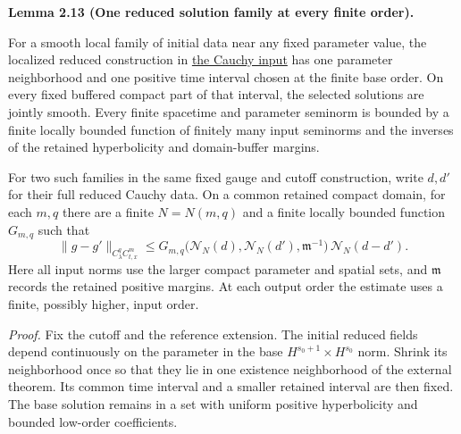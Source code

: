 \documentclass[
  english,
  11pt,
  reqno]{amsart}
\makeatletter
\newcommand{\pandocstatementheading}[1]{%
  \par\if@nobreak\else
    \addpenalty{\@beginparpenalty}%
    \addvspace{.5\baselineskip plus .2\baselineskip minus .2\baselineskip}%
  \fi
  {\normalfont\bfseries #1\par}%
  \nobreak\@afterindenttrue\@afterheading
}
\makeatother
\begin{document}
\pandocstatementheading{\leavevmode{}\label{lem:online-reduced-cauchy-finite-family-estimates}Lemma 2.13 (One reduced solution family at every finite order).}

For a smooth local family of initial data near any fixed parameter
value, the localized reduced construction in
\hyperref[thm:online-smooth-local-cauchy-input]{the Cauchy input} has
one parameter neighborhood and one positive time interval chosen at the
finite base order. On every fixed buffered compact part of that
interval, the selected solutions are jointly smooth. Every finite
spacetime and parameter seminorm is bounded by a finite locally bounded
function of finitely many input seminorms and the inverses of the
retained hyperbolicity and domain-buffer margins.

For two such families in the same fixed gauge and cutoff construction,
write \(d,d'\) for their full reduced Cauchy data. On a common retained
compact domain, for each \(m,q\) there are a finite \(N=N(m,q)\) and a
finite locally bounded function \(G_{m,q}\) such that%
 \[
\|g-g'\|_{C^q_\lambda C^m_{t,x}}
\le
G_{m,q}\bigl(\mathcal N_N(d),\mathcal N_N(d'),
\mathfrak m^{-1}\bigr)\,
\mathcal N_N(d-d').
\] Here all input norms use the larger compact parameter and spatial
sets, and \(\mathfrak m\) records the retained positive margins. At each
output order the estimate uses a finite, possibly higher, input order.

\emph{Proof.} Fix the cutoff and the reference extension. The initial
reduced fields depend continuously on the parameter in the base
\(H^{s_0+1}\times H^{s_0}\) norm. Shrink its neighborhood once so that
they lie in one existence neighborhood of the external theorem. Its
common time interval and a smaller retained interval are then fixed. The
base solution remains in a set with uniform positive hyperbolicity and
bounded low-order coefficients.
\end{document}
